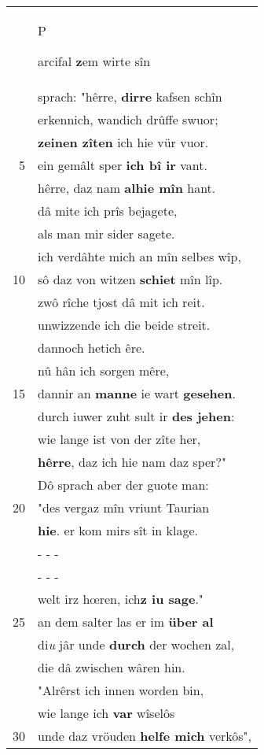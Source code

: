 \documentclass[8pt,a4paper,notitlepage]{article}
\begin{document}
\begin{table}[ht]
\begin{minipage}[t]{0.5\linewidth}
\begin{tabular}{rl}
 & \begin{large}P\end{large}arcifal \textbf{z}em wirte sîn\\ 
 & sprach: "hêrre, \textbf{dirre} kafsen schîn\\ 
 & erkennich, wandich drûffe swuor;\\ 
 & \textbf{zeinen zîten} ich hie vür vuor.\\ 
5 & ein gemâlt sper \textbf{ich bî ir} vant.\\ 
 & hêrre, daz nam \textbf{alhie mîn} hant.\\ 
 & dâ mite ich prîs bejagete,\\ 
 & als man mir sider sagete.\\ 
 & ich verdâhte mich an mîn selbes wîp,\\ 
10 & sô daz von witzen \textbf{schiet} mîn lîp.\\ 
 & zwô rîche tjost dâ mit ich reit.\\ 
 & unwizzende ich die beide streit.\\ 
 & dannoch hetich êre.\\ 
 & nû hân ich sorgen mêre,\\ 
15 & dannir an \textbf{manne} ie wart \textbf{gesehen}.\\ 
 & durch iuwer zuht sult ir \textbf{des jehen}:\\ 
 & wie lange ist von der zîte her,\\ 
 & \textbf{hêrre}, daz ich hie nam daz sper?"\\ 
 & Dô sprach aber der guote man:\\ 
20 & "des vergaz mîn vriunt Taurian\\ 
 & \textbf{hie}. er kom mirs sît in klage.\\ 
 & \multicolumn{1}{l}{ - - - }\\ 
 & \multicolumn{1}{l}{ - - - }\\ 
 & welt irz hœren, ich\textbf{z iu sage}."\\ 
25 & an dem salter las er im \textbf{über al}\\ 
 & di\textit{u} jâr unde \textbf{durch} der wochen zal,\\ 
 & die dâ zwischen wâren hin.\\ 
 & "Alrêrst ich innen worden bin,\\ 
 & wie lange ich \textbf{var} wîselôs\\ 
30 & unde daz vröuden \textbf{helfe mich} verkôs",\\ 
\end{tabular}

\end{minipage}
\end{table}
\end{document}
